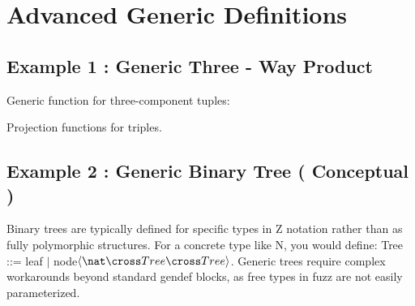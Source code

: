 \documentclass[a4paper,10pt,fleqn]{article}
\begin{document}
\section*{Advanced Generic Definitions}

\begin{zed}
[BGA]
\end{zed}

\subsection*{Example 1 : Generic Three - Way Product}

\noindent Generic function for three-component tuples:

\bigskip


\noindent Projection functions for triples.

\bigskip

\subsection*{Example 2 : Generic Binary Tree ( Conceptual )}

\noindent Binary trees are typically defined for specific types in Z notation rather than as fully polymorphic structures. For a concrete type like N, you would define: Tree ::= leaf $|$ node$\langle \nat \cross Tree \cross Tree \rangle$. Generic trees require complex workarounds beyond standard gendef blocks, as free types in fuzz are not easily parameterized.
\end{document}
